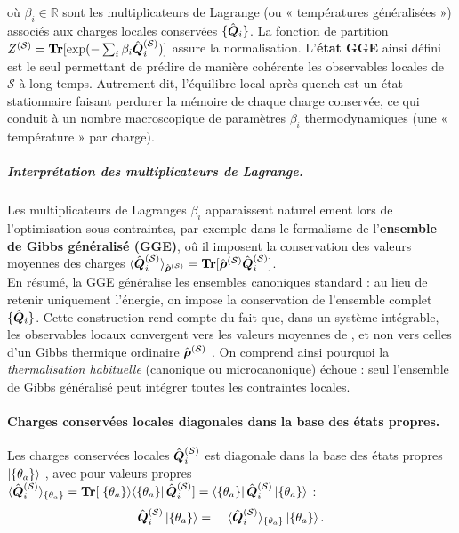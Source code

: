 où $\beta_i \in \mathbb{R}$ sont les multiplicateurs de Lagrange (ou « températures généralisées ») associés aux charges locales conservées $\{\hat{\bm{Q}}_i\}$. La fonction de partition $Z^{(\mathcal{S})} = \bm{\mathrm{Tr}}[\exp ( - \sum_i \beta_i \hat{\bm{Q}}_i^{(\mathcal{S})} ) ]$ assure la normalisation. L’{\bf état GGE} ainsi défini est le seul permettant de prédire de manière cohérente les observables locales de $\mathcal{S}$ à long temps. Autrement dit, l’équilibre local après quench est un état stationnaire faisant perdurer la mémoire de chaque charge conservée, ce qui conduit à un nombre macroscopique de paramètres $\beta_i$ thermodynamiques (une « température » par charge).

 \subparagraph{Interprétation des multiplicateurs de Lagrange.}
Les multiplicateurs de Lagranges $\beta_i$ apparaissent naturellement lors de l'optimisation sous contraintes, par exemple dans le formalisme de l'{\bf ensemble de Gibbs généralisé (GGE)}, oû il imposent la conservation des valeurs moyennes des charges $\langle \hat{\bm{Q}}_i^{(\mathcal{S})} \rangle_{\hat{\bm{\rho}}^{(\mathcal{S})}} = \bm{\mathrm{Tr}}[\hat{\bm{\rho}}^{(\mathcal{S})} \hat{\bm{Q}}_i^{(\mathcal{S})}]   $.\\

En résumé, la GGE généralise les ensembles canoniques standard : au lieu de retenir uniquement l’énergie, on impose la conservation de l’ensemble complet $\{\hat{\bm{Q}}_i \}$. Cette construction rend compte du fait que, dans un système intégrable, les observables locaux convergent vers les valeurs moyennes de , et non vers celles d’un Gibbs thermique ordinaire $\hat{\bm{\rho}}^{(\mathcal{S})}$ . On comprend ainsi pourquoi la {\em thermalisation habituelle} (canonique ou microcanonique) échoue : seul l’ensemble de Gibbs généralisé peut intégrer toutes les contraintes locales.



\paragraph{Charges conservées locales diagonales dans la base des états propres.}
Les charges conservées locales $\hat{\bm{Q}}_i^{(\mathcal{S})}$ est diagonale dans la base des  états propres $\ket{ \{ \theta_a \}}$ , avec pour valeurs propres $\langle \hat{\bm{Q}}_i^{(\mathcal{S})} \rangle_{\{\theta_a \}} = \bm{\mathrm{Tr}}[\ket{\{\theta_a \}}\!\bra{\{\theta_a \}} \hat{\bm{Q}}_i^{(\mathcal{S})}] =  \bra{\{\theta_a \}} \hat{\bm{Q}}_i^{(\mathcal{S})} \ket{\{\theta_a \}}$ :
\begin{eqnarray}
	\operator{Q}_i^{(\mathcal{S})}\ket{\{\theta_a \}} & = &  \langle \operator{Q}_i^{(\mathcal{S})} \rangle_{\{\theta_a \}}  \ket{\{\theta_a \}}.		
\end{eqnarray}

